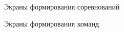 \begin{figure}[ht!]
	\caption{Экраны формирования соревнований}
	\label{fig:gui3}
\end{figure}

\begin{figure}[ht!]
	\caption{Экраны формирования команд}
	\label{fig:gui4}
\end{figure}

